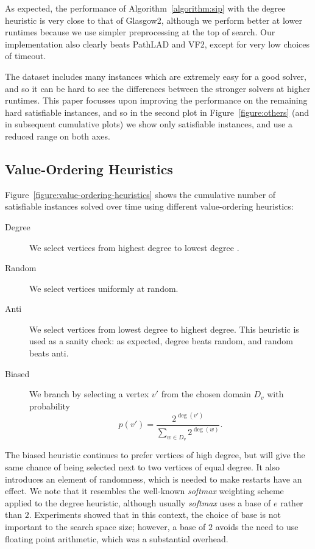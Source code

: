 \documentclass[a4paper,UKenglish]{lipics-v2018}
\newcommand{\figureref}[1]{Figure~\ref{#1}}
\newcommand{\Figureref}[1]{Figure~\ref{#1}}
\newcommand{\algorithmref}[1]{Algorithm~\ref{#1}}
\begin{document}
As expected, the performance of \algorithmref{algorithm:sip} with the degree heuristic is very close to that
of Glasgow2, although we perform better at lower runtimes because we use simpler preprocessing at
the top of search. Our implementation also clearly beats PathLAD and VF2, except for very low
choices of timeout.

The dataset includes many instances which are extremely easy for a good solver, and so it can be
hard to see the differences between the stronger solvers at higher runtimes. This paper focusses
upon improving the performance on the remaining hard satisfiable instances, and so in the second
plot in \figureref{figure:others} (and in subsequent cumulative plots) we show only satisfiable
instances, and use a reduced range on both axes.

\subsection{Value-Ordering Heuristics}

\Figureref{figure:value-ordering-heuristics} shows the cumulative number of satisfiable instances
solved over time using different value-ordering heuristics:

\begin{description}
\item[Degree] We select vertices from highest degree to lowest degree
\cite{DBLP:conf/ijcai/McCreeshPT16}.

\item[Random] We select vertices uniformly at random.

\item[Anti] We select vertices from lowest degree to highest degree. This heuristic is used as
a sanity check: as expected, degree beats random, and random beats anti.

\item[Biased] We branch by selecting a vertex $v'$ from the chosen domain $D_v$ with
probability \[ p(v') = \frac{2^{\deg(v')}}{\sum_{w \in D_v}{2^{\deg(w)}}} \text{.} \]\end{description}

The biased heuristic continues to prefer vertices of high degree, but will give the same chance of
being selected next to two vertices of equal degree.  It also introduces an element of randomness,
which is needed to make restarts have an effect.  We note that it resembles the well-known
\emph{softmax} weighting scheme applied to the degree heuristic, although usually \emph{softmax}
uses a base of $e$ rather than $2$.  Experiments showed that in this context, the choice of base is
not important to the search space size; however, a base of $2$ avoids the need to use floating point
arithmetic, which was a substantial overhead.
\end{document}
